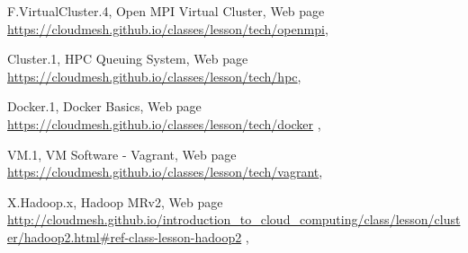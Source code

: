 F.VirtualCluster.4, Open MPI Virtual Cluster,  Web page \url{https://cloudmesh.github.io/classes/lesson/tech/openmpi},

Cluster.1, HPC Queuing System, Web page \url{https://cloudmesh.github.io/classes/lesson/tech/hpc},

Docker.1, Docker Basics, Web page \url{https://cloudmesh.github.io/classes/lesson/tech/docker} ,

VM.1, VM Software - Vagrant, Web page
\url{https://cloudmesh.github.io/classes/lesson/tech/vagrant}, 

X.Hadoop.x, Hadoop MRv2, Web page \url{http://cloudmesh.github.io/introduction_to_cloud_computing/class/lesson/cluster/hadoop2.html#ref-class-lesson-hadoop2} ,



